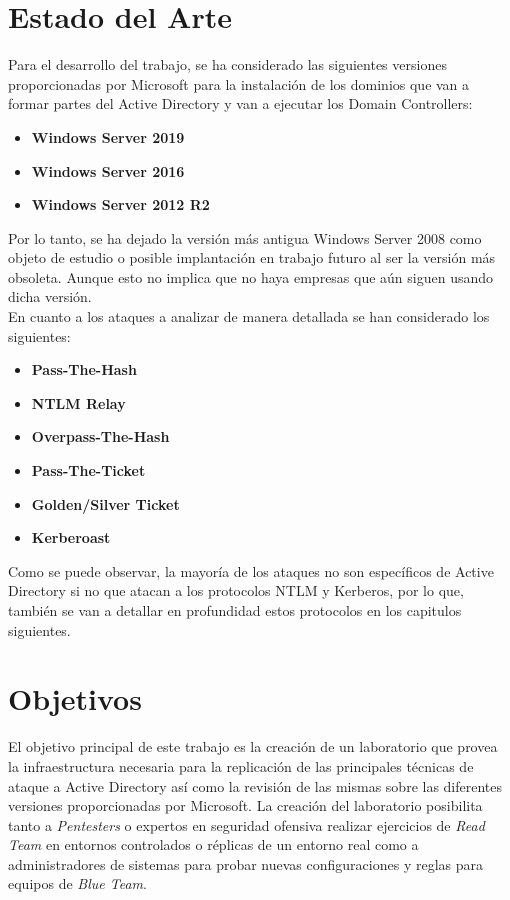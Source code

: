 \section{Estado del Arte}

Para el desarrollo del trabajo, se ha considerado las siguientes versiones proporcionadas por Microsoft para la instalación de los dominios que van a formar partes del Active Directory y van a ejecutar los Domain Controllers:\\

\begin{itemize}
\item \textbf{Windows Server 2019}
\item \textbf{Windows Server 2016}
\item \textbf{Windows Server 2012 R2}
\end{itemize}

Por lo tanto, se ha dejado la versión más antigua Windows Server 2008 como objeto de estudio o posible implantación en trabajo futuro al ser la versión más obsoleta. Aunque esto no implica que no haya empresas que aún siguen usando dicha versión. \\

En cuanto a los ataques a analizar de manera detallada se han considerado los siguientes: 

\begin{itemize}
\item \textbf{Pass-The-Hash}
\item \textbf{NTLM Relay}
\item \textbf{Overpass-The-Hash}
\item \textbf{Pass-The-Ticket}
\item \textbf{Golden/Silver Ticket}
\item \textbf{Kerberoast}
\end{itemize}

Como se puede observar, la mayoría de los ataques no son específicos de Active Directory si no que atacan a los protocolos NTLM y Kerberos, por lo que, también se van a detallar en profundidad estos protocolos en los capitulos siguientes.


\section{Objetivos}

El objetivo principal de este trabajo es la creación de un laboratorio que provea la infraestructura necesaria para la replicación de las principales técnicas de ataque a Active Directory así como la revisión de las mismas sobre las diferentes versiones proporcionadas por Microsoft. La creación del laboratorio posibilita tanto a {\it Pentesters} o expertos en seguridad ofensiva realizar ejercicios de {\it Read Team} en entornos controlados o réplicas de un entorno real como a administradores de sistemas para probar nuevas configuraciones y reglas para equipos de {\it Blue Team}.\\


